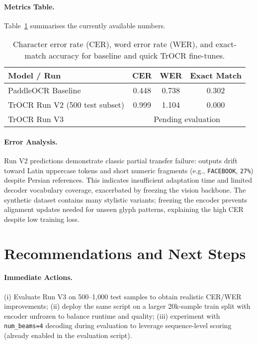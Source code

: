 \documentclass[11pt,a4paper]{article}
\begin{document}
\paragraph{Metrics Table.} Table~\ref{tab:metrics} summarises the currently available numbers.

\begin{table}[h]
  \centering
  \begin{tabular}{lccc}
    \toprule
    Model / Run & CER & WER & Exact Match \\
    \midrule
    PaddleOCR Baseline & 0.448 & 0.738 & 0.302 \\
    TrOCR Run V2 (500 test subset) & 0.999 & 1.104 & 0.000 \\
    TrOCR Run V3 & \multicolumn{3}{c}{Pending evaluation} \\
    \bottomrule
  \end{tabular}
  \caption{Character error rate (CER), word error rate (WER), and exact-match accuracy for baseline and quick TrOCR fine-tunes.}
  \label{tab:metrics}
\end{table}

\paragraph{Error Analysis.} Run V2 predictions demonstrate classic partial transfer failure: outputs drift toward Latin uppercase tokens and short numeric fragments (e.g., \texttt{FACEBOOK}, \texttt{27\%}) despite Persian references. This indicates insufficient adaptation time and limited decoder vocabulary coverage, exacerbated by freezing the vision backbone. The synthetic dataset contains many stylistic variants; freezing the encoder prevents alignment updates needed for unseen glyph patterns, explaining the high CER despite low training loss.

\section{Recommendations and Next Steps}
\paragraph{Immediate Actions.} (i) Evaluate Run V3 on 500--1,000 test samples to obtain realistic CER/WER improvements; (ii) deploy the same script on a larger 20k-sample train split with encoder unfrozen to balance runtime and quality; (iii) experiment with \texttt{num\_beams=4} decoding during evaluation to leverage sequence-level scoring (already enabled in the evaluation script).
\end{document}
